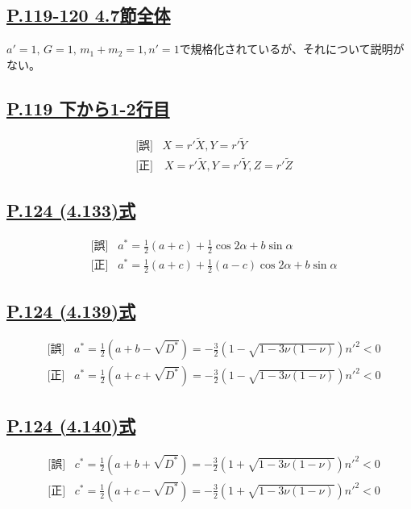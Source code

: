 \documentclass[9pt,fleqn]{bxjsarticle}
\begin{document}
\subsection*{\underline{P.119-120 4.7節全体}}
$a'=1,\,G=1,\,m_1+m_2=1,n'=1$で規格化されているが、それについて説明がない。

\subsection*{\underline{P.119 下から1-2行目}}
\begin{align*}
    &\text{[誤]} \hspace{10pt} X=r'\tilde{X},Y=r'\tilde{Y} \\
    &\text{[正]}\,\,\,\,\,\, X=r'\tilde{X},Y=r'\tilde{Y},Z=r'\tilde{Z} 
\end{align*}

\subsection*{\underline{P.124 (4.133)式}}
\begin{align*}
    &\text{[誤]} \hspace{10pt} a^* = \frac{1}{2}(a+c) + \frac{1}{2}\cos2\alpha + b\sin\alpha \\
    &\text{[正]} \hspace{10pt} a^* = \frac{1}{2}(a+c) + \frac{1}{2}(a-c)\cos2\alpha + b\sin\alpha
\end{align*}

\subsection*{\underline{P.124 (4.139)式}}
\begin{align*}
    &\text{[誤]} \hspace{10pt} a^* = \frac{1}{2}(a+b-\sqrt{D^*}) = -\frac{3}{2}(1-\sqrt{1-3\nu(1-\nu)})n'^2 < 0 \\
    &\text{[正]} \hspace{10pt} a^* = \frac{1}{2}(a+c+\sqrt{D^*}) = -\frac{3}{2}(1-\sqrt{1-3\nu(1-\nu)})n'^2 < 0 
\end{align*}

\subsection*{\underline{P.124 (4.140)式}}
\begin{align*}
    &\text{[誤]} \hspace{10pt} c^* = \frac{1}{2}(a+b+\sqrt{D^*}) = -\frac{3}{2}(1+\sqrt{1-3\nu(1-\nu)})n'^2 < 0 \\
    &\text{[正]} \hspace{10pt} c^* = \frac{1}{2}(a+c-\sqrt{D^*}) = -\frac{3}{2}(1+\sqrt{1-3\nu(1-\nu)})n'^2 < 0 
\end{align*}
\end{document}
